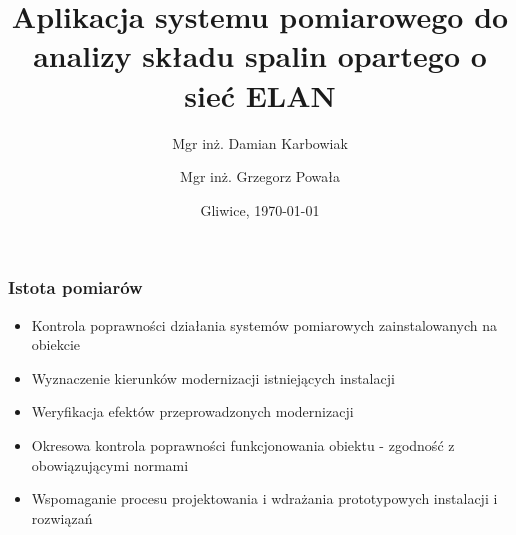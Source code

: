 \documentclass[ucs]{beamer}
\title[Gas Analyzer]{Aplikacja systemu pomiarowego do analizy składu spalin opartego o sieć ELAN}
\author[D. Karbowiak, G. Powała]{Mgr inż. Damian Karbowiak  \and Mgr inż. Grzegorz Powała}
\institute[Politechnika Śl.]{\large Politechnika Śląska \\\vspace{0.5cm} \texttt{[image: images/PolslLogo]} }
\date{Gliwice, \today}
\begin{document}
\begin{frame}
  \titlepage
\end{frame}

\begin{frame}
\frametitle{Istota pomiarów}
\begin{itemize}
\setlength{\itemsep}{5pt}
\setlength{\parskip}{5pt}
\setlength{\parsep}{5pt}
\item Kontrola poprawności działania systemów pomiarowych zainstalowanych na obiekcie
\item Wyznaczenie kierunków modernizacji istniejących instalacji
\item Weryfikacja efektów przeprowadzonych modernizacji
\item Okresowa kontrola poprawności funkcjonowania obiektu - zgodność z obowiązującymi normami
\item Wspomaganie procesu projektowania i wdrażania prototypowych instalacji i rozwiązań
\end{itemize}
\end{frame}
\end{document}
